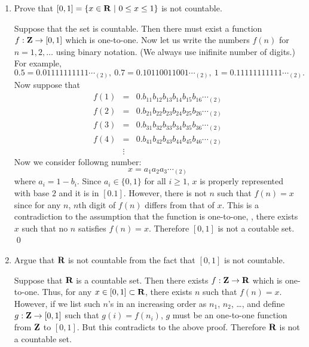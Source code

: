 \begin{enumerate}
\begin{enumerate}
		\item Prove that $[0,1] = \{x\in{\mbox{\bf R}}~|~0\leq x\leq1\}$ is not countable.
		\ifdefined\sol
		\begin{solution}
			Suppose that the set is countable.
			Then there must exist a function $f:{\mbox{\bf Z}}\to[0,1]$ which is one-to-one.
			Now let us write the numbers $f(n)$ for $n=1,2,\ldots$
			using binary notation.  (We always use inifinite number of digits.)
			For example,
			\[
				0.5 = 0.01111111111\cdots_{(2)},\
				0.7 = 0.10110011001\cdots_{(2)},\
				1 = 0.11111111111\cdots_{(2)}.
			\]
			Now suppose that
			\begin{eqnarray*}
				f(1) &=& 0.b_{11} b_{12} b_{13} b_{14} b_{15} b_{16} \cdots_{(2)}
				\\f(2) &=& 0.b_{21} b_{22} b_{23} b_{24} b_{25} b_{26} \cdots_{(2)}
				\\f(3) &=& 0.b_{31} b_{32} b_{33} b_{34} b_{35} b_{36} \cdots_{(2)}
				\\f(4) &=& 0.b_{41} b_{42} b_{43} b_{44} b_{45} b_{46} \cdots_{(2)}
				\\ &\vdots&
			\end{eqnarray*}
			\newcommand{\bb}[1]{(1-b_{#1 #1})}
			Now we consider followng number:
			\[
				x = a_1 a_2 a_3 \cdots_{(2)}
			\]
			where $a_i = 1-b_i$. Since $a_i\in\{0,1\}$ for all $i\geq 1$,
			$x$ is properly represented with base $2$ and it is in $[0.1]$.
			However, there is not $n$ such that $f(n)=x$
			since for any $n$, $n$th digit of $f(n)$ differs from that of $x$.
			This is a contradiction to the assumption that the function is one-to-one,
			\ie, there exists $x$ such that no $n$ satisfies $f(n)=x$.
			Therefore $[0,1]$ is not a coutable set.
			\qed
		\end{solution}
		\fi

		\item Argue that ${\mbox{\bf R}}$ is not countable from the fact that $[0,1]$ is not countable.
		\ifdefined\sol
		\begin{solution}
			Suppose that ${\mbox{\bf R}}$ is a countable set.
			Then there exists $f:{\mbox{\bf Z}} \to {\mbox{\bf R}}$ which is one-to-one.
			Thus, for any $x\in[0,1]\subset {\mbox{\bf R}}$, there exists $n$ such that $f(n)=x$.
			However, if we list such $n$'s in an increasing order
			as $n_1$, $n_2$, \ldots,
			and define $g:{\mbox{\bf Z}}\to[0,1]$
			such that $g(i) = f(n_i)$,
			$g$ must be an one-to-one function from ${\mbox{\bf Z}}$ to $[0,1]$.
			But this contradicts to the above proof.
			Therefore ${\mbox{\bf R}}$ is not a countable set.
		\end{solution}
		\fi
	\end{enumerate}


\end{enumerate}
